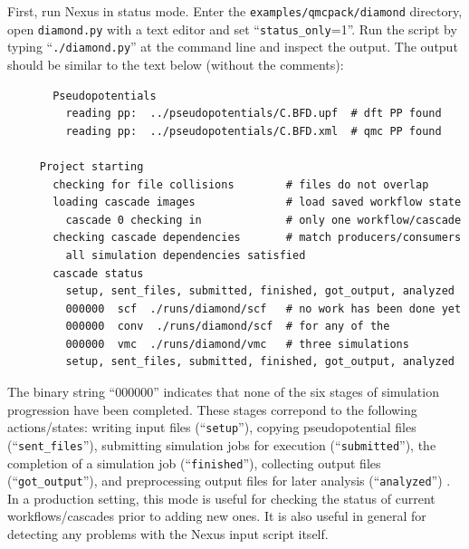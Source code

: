 \documentclass[oneside,11pt]{memoir}
\numberwithin{equation}{section}
\begin{document}
First, run Nexus in status mode.  Enter the \texttt{examples/qmcpack/diamond} directory, open \texttt{diamond.py} with a text editor and set ``\texttt{status\_only}=1''.  Run the script by typing ``\texttt{./diamond.py}'' at the command line and inspect the output.  The output should be similar to the text below (without the comments):
\begin{shaded}
\begin{verbatim}
       Pseudopotentials
         reading pp:  ../pseudopotentials/C.BFD.upf  # dft PP found
         reading pp:  ../pseudopotentials/C.BFD.xml  # qmc PP found
     
     Project starting 
       checking for file collisions        # files do not overlap
       loading cascade images              # load saved workflow state    
         cascade 0 checking in             # only one workflow/cascade
       checking cascade dependencies       # match producers/consumers
         all simulation dependencies satisfied 
       cascade status 
         setup, sent_files, submitted, finished, got_output, analyzed 
         000000  scf  ./runs/diamond/scf   # no work has been done yet
         000000  conv  ./runs/diamond/scf  # for any of the
         000000  vmc  ./runs/diamond/vmc   # three simulations
         setup, sent_files, submitted, finished, got_output, analyzed 
\end{verbatim}
\end{shaded}

{\flushleft
The binary string ``000000'' indicates that none of the six stages of simulation progression have been completed.  These stages correpond to the following actions/states: writing input files (``\texttt{setup}''), copying pseudopotential files (``\texttt{sent\_files}''), submitting simulation jobs for execution (``\texttt{submitted}''), the completion of a simulation job (``\texttt{finished}''), collecting output files (``\texttt{got\_output}''), and preprocessing output files for later analysis (``\texttt{analyzed}'') .  In a production setting, this mode is useful for checking the status of current workflows/cascades prior to adding new ones.  It is also useful in general for detecting any problems with the Nexus input script itself.
}
\end{document}

